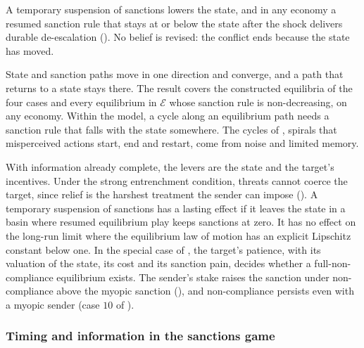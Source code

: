  A
temporary suspension of sanctions lowers the state, and in any economy a resumed sanction
rule that stays at or below the state after the shock delivers durable
de-escalation (). No belief is revised: the
conflict ends because the state has moved.

 State
and sanction paths move in one direction and converge, and a path that returns to
a state stays there. The result covers the constructed equilibria of the four cases and
every equilibrium in $\mathcal E$ whose sanction rule is non-decreasing, on any
economy. Within the model, a cycle along an equilibrium path
needs a sanction rule that falls with the state somewhere. The cycles of
\citet{AcemogluWolitzky2014}, spirals that misperceived actions start, end and
restart, come from noise and limited memory.

 With information
already complete, the levers are the state and the target's incentives. Under the
strong entrenchment condition, threats cannot coerce the target, since relief is the
harshest treatment the sender can impose (). A temporary
suspension of sanctions has a lasting effect if it leaves the state in a basin where resumed
equilibrium play keeps sanctions at zero. It has no
effect on the long-run limit where the equilibrium law of motion has an explicit
Lipschitz constant below one.
In the special case of , the target's patience, with
its valuation of the state, its cost and its sanction pain, decides whether a
full-non-compliance equilibrium exists. The sender's stake raises the sanction under
non-compliance above the myopic sanction (), and non-compliance persists
even with a myopic sender (case $10$ of ).

\subsubsection*{Timing and information in the sanctions game}
\label{sec:model:conflict-structure}


